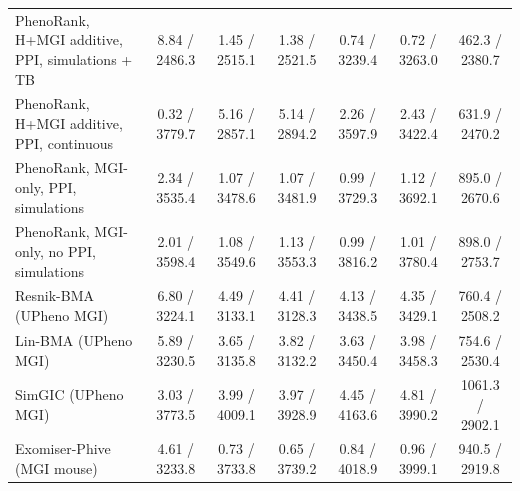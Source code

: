\begin{table}[tb]
\begin{tabular}{lcccccc}
PhenoRank, H+MGI additive, PPI, simulations + TB & 8.84 / 2486.3 & 1.45 / 2515.1 & 1.38 / 2521.5 & 0.74 / 3239.4 & 0.72 / 3263.0 & 462.3 / 2380.7 \\
PhenoRank, H+MGI additive, PPI, continuous & 0.32 / 3779.7 & 5.16 / 2857.1 & 5.14 / 2894.2 & 2.26 / 3597.9 & 2.43 / 3422.4 & 631.9 / 2470.2 \\
PhenoRank, MGI-only, PPI, simulations & 2.34 / 3535.4 & 1.07 / 3478.6 & 1.07 / 3481.9 & 0.99 / 3729.3 & 1.12 / 3692.1 & 895.0 / 2670.6 \\
PhenoRank, MGI-only, no PPI, simulations & 2.01 / 3598.4 & 1.08 / 3549.6 & 1.13 / 3553.3 & 0.99 / 3816.2 & 1.01 / 3780.4 & 898.0 / 2753.7 \\
Resnik-BMA (UPheno MGI) & 6.80 / 3224.1 & 4.49 / 3133.1 & 4.41 / 3128.3 & 4.13 / 3438.5 & 4.35 / 3429.1 & 760.4 / 2508.2 \\
Lin-BMA (UPheno MGI) & 5.89 / 3230.5 & 3.65 / 3135.8 & 3.82 / 3132.2 & 3.63 / 3450.4 & 3.98 / 3458.3 & 754.6 / 2530.4 \\
SimGIC (UPheno MGI) & 3.03 / 3773.5 & 3.99 / 4009.1 & 3.97 / 3928.9 & 4.45 / 4163.6 & 4.81 / 3990.2 & 1061.3 / 2902.1 \\
Exomiser-Phive (MGI mouse) & 4.61 / 3233.8 & 0.73 / 3733.8 & 0.65 / 3739.2 & 0.84 / 4018.9 & 0.96 / 3999.1 & 940.5 / 2919.8 \\
\bottomrule
\end{tabular}
\end{table}
